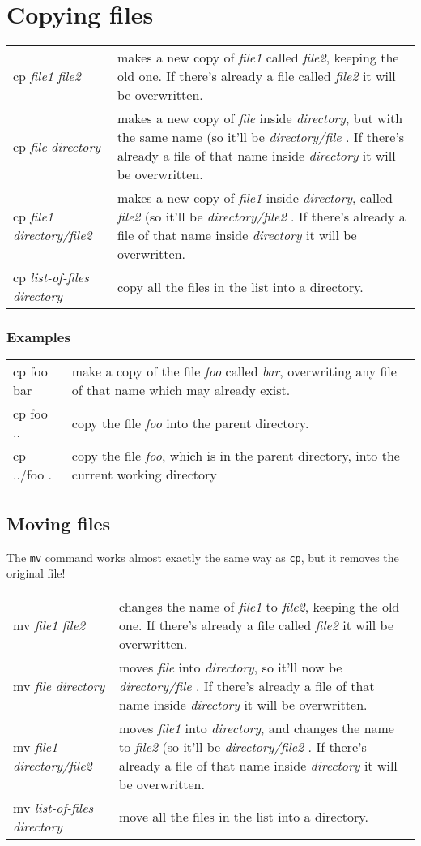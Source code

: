 \documentclass[twocolumn]{article}
\begin{document}
\section{Copying files}
\begin{tabular}{l|p{2in}}
cp \emph{file1} \emph{file2} & makes a new copy of \emph{file1} called \emph{file2}, keeping the old one.
If there's already a file called \emph{file2} it will be overwritten.\\
cp \emph{file} \emph{directory} & makes a new copy of \emph{file} inside
\emph{directory}, but with the same name (so it'll be \emph{directory/file} .
If there's already a file of that name inside \emph{directory} it will
be overwritten.\\
cp \emph{file1} \emph{directory/file2} & makes a new copy of \emph{file1}
inside \emph{directory}, called \emph{file2} (so it'll be \emph{directory/file2} .
If there's already a file of that name inside \emph{directory} it will
be overwritten.\\
cp \emph{list-of-files} \emph{directory} & copy all the files in the list
into a directory.
\end{tabular}

\subsubsection{Examples}
\begin{tabular}{l|p{2in}}
cp foo bar & make a copy of the file \emph{foo} called \emph{bar}, overwriting
any file of that name which may already exist.\\
cp foo .. & copy the file \emph{foo} into the parent directory.\\
cp ../foo . & copy the file \emph{foo}, which is in the parent directory, into the current working directory \\
\end{tabular}

\subsection{Moving files}
The \verb+mv+ command works almost exactly the same way as \verb+cp+, but
it removes the original file!
\begin{tabular}{l|p{2in}}
mv \emph{file1} \emph{file2} & changes the name of \emph{file1} to \emph{file2}, keeping the old one.
If there's already a file called \emph{file2} it will be overwritten.\\
mv \emph{file} \emph{directory} & moves \emph{file} into
\emph{directory}, so it'll now be \emph{directory/file} .
If there's already a file of that name inside \emph{directory} it will
be overwritten.\\
mv \emph{file1} \emph{directory/file2} & moves \emph{file1}
into \emph{directory}, and changes the name to \emph{file2} (so it'll be \emph{directory/file2} .
If there's already a file of that name inside \emph{directory} it will
be overwritten.\\
mv \emph{list-of-files} \emph{directory} & move all the files in the list
into a directory.
\end{tabular}
\end{document}
